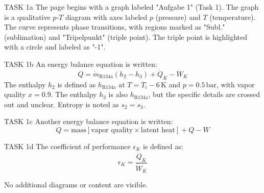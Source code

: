 TASK 1a  
The page begins with a graph labeled "Aufgabe 1" (Task 1). The graph is a qualitative \( p \)-\( T \) diagram with axes labeled \( p \) (pressure) and \( T \) (temperature). The curve represents phase transitions, with regions marked as "Subl." (sublimation) and "Tripelpunkt" (triple point). The triple point is highlighted with a circle and labeled as "-1".  

TASK 1b  
An energy balance equation is written:  
\[
Q = \dot{m}_{\text{R134a}} \left( h_2 - h_3 \right) + \dot{Q}_K - \dot{W}_K
\]  
The enthalpy \( h_2 \) is defined as \( h_{\text{R134a}} \) at \( T = T_i - 6 \, \text{K} \) and \( p = 0.5 \, \text{bar} \), with vapor quality \( x = 0.9 \).  
The enthalpy \( h_3 \) is also \( h_{\text{R134a}} \), but the specific details are crossed out and unclear.  
Entropy is noted as \( s_2 = s_3 \).  

TASK 1c  
Another energy balance equation is written:  
\[
Q = \text{mass} \left[ \text{vapor quality} \times \text{latent heat} \right] + Q - W
\]  

TASK 1d  
The coefficient of performance \( \epsilon_K \) is defined as:  
\[
\epsilon_K = \frac{\dot{Q}_K}{\dot{W}_K}
\]  

No additional diagrams or content are visible.